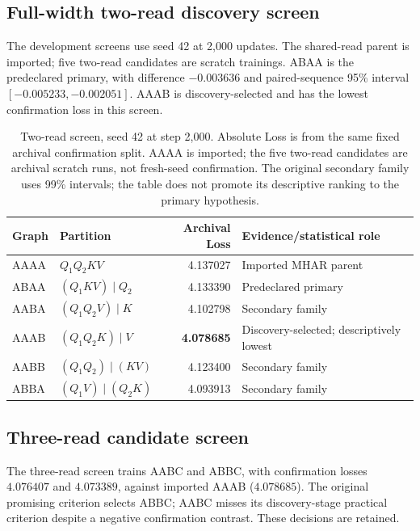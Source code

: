 \documentclass[11pt,letterpaper]{article}
\newcommand{\route}[1]{\textsf{#1}}
\newcommand{\LossAAAA}{4.137027}
\newcommand{\LossABAA}{4.133390}
\newcommand{\LossAABA}{4.102798}
\newcommand{\LossAAAB}{4.078685}
\newcommand{\LossAABB}{4.123400}
\newcommand{\LossABBA}{4.093913}
\newcommand{\LossAABC}{4.076407}
\newcommand{\LossABBC}{4.073389}
\newcommand{\DeltaABAA}{-0.003636}
\newcommand{\LowABAA}{-0.005233}
\newcommand{\HighABAA}{-0.002051}
\begin{document}
\subsection{Full-width two-read discovery screen}
The development screens use seed 42 at 2,000 updates.
The shared-read parent is imported; five two-read candidates are scratch
trainings. \route{ABAA} is the predeclared primary, with difference
$\DeltaABAA$ and paired-sequence 95\% interval
$[\LowABAA,\HighABAA]$. \route{AAAB} is discovery-selected and has the
lowest confirmation loss in this screen.

\begin{table}[!ht]
\centering
\small
\begin{tabularx}{\textwidth}{@{}llrY@{}}
\toprule
Graph & Partition & Archival Loss & Evidence/statistical role \\
\midrule
\route{AAAA} & $Q_1Q_2KV$ & \LossAAAA & Imported MHAR parent \\
\route{ABAA} & $(Q_1KV)\mid Q_2$ & \LossABAA & Predeclared primary \\
\route{AABA} & $(Q_1Q_2V)\mid K$ & \LossAABA & Secondary family \\
\route{AAAB} & $(Q_1Q_2K)\mid V$ & \textbf{\LossAAAB} & Discovery-selected; descriptively lowest \\
\route{AABB} & $(Q_1Q_2)\mid(KV)$ & \LossAABB & Secondary family \\
\route{ABBA} & $(Q_1V)\mid(Q_2K)$ & \LossABBA & Secondary family \\
\bottomrule
\end{tabularx}
\caption{Two-read screen, seed 42 at step 2,000. Absolute Loss is from the same
fixed archival confirmation split. \route{AAAA} is imported; the five two-read
candidates are archival scratch runs, not fresh-seed confirmation. The original
secondary family uses 99\% intervals;
the table does not promote its descriptive ranking to the primary hypothesis.}
\label{tab:two}
\end{table}
\subsection{Three-read candidate screen}
The three-read screen trains \route{AABC} and \route{ABBC}, with confirmation
losses $\LossAABC$ and $\LossABBC$, against imported \route{AAAB}
($\LossAAAB$). The original promising criterion selects \route{ABBC};
\route{AABC} misses its discovery-stage practical criterion despite a
negative confirmation contrast. These decisions are retained.
\end{document}
